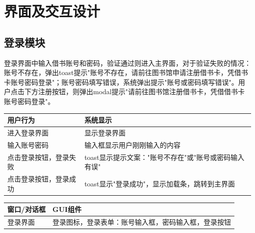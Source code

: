 \section{界面及交互设计}
\subsection{登录模块}
登录界面中输入借书账号和密码，验证通过则进入主界面，对于验证失败的情况：账号不存在，弹出toast提示"账号不存在，请前往图书馆申请注册借书卡，凭借书卡账号密码登录"；账号密码填写错误，系统弹出提示"账号或密码填写错误"。用户点击下方注册按钮，则弹出modal提示"请前往图书馆注册借书卡，凭借借书卡账号密码登录"。
\begin{table}[ht]
    \centering
    \begin{tabular*}{\textwidth}{p{}p{}}
        \hline
        用户行为  & 系统显示 \\
        \hline
        进入登录界面 & 显示登录界面 \\
        输入账号密码 & 输入框显示用户刚刚输入的内容 \\
        点击登录按钮，登录失败 & toast显示提示文案："账号不存在"或"账号或密码输入有误"\\
        点击登录按钮，登录成功 & toast显示"登录成功"，显示加载条，跳转到主界面 \\
        \hline
    \end{tabular*}
    \begin{tabular*}{\textwidth}{p{}p{}}
        \hline
        窗口/对话框  & GUI组件 \\
        \hline
        登录界面 & 登录图标，登录表单：账号输入框，密码输入框，登录按钮 \\
        \hline
    \end{tabular*}
\end{table}
